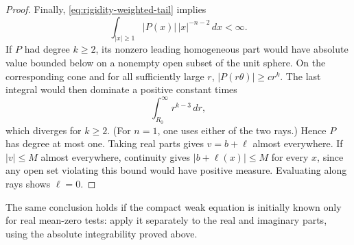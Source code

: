 \begin{proof}
Finally, \eqref{eq:rigidity-weighted-tail} implies
\[
 \int_{|x|\ge1}|P(x)|\,|x|^{-n-2}\,dx<\infty.
\]
If $P$ had degree $k\ge2$, its nonzero leading homogeneous part would
have absolute value bounded below on a nonempty open subset of the unit
sphere.  On the corresponding cone and for all sufficiently large $r$,
$|P(r\theta)|\ge c r^k$.  The last integral would then dominate a
positive constant times
\[
 \int_{R_0}^{\infty}r^{k-3}\,dr,
\]
which diverges for $k\ge2$.  (For $n=1$, one uses either of the two
rays.)  Hence $P$ has degree at most one.  Taking real parts gives
$v=b+\ell$ almost everywhere.
If $|v|\le M$ almost everywhere, continuity gives
$|b+\ell(x)|\le M$ for every $x$, since any open set violating this bound
would have positive measure.  Evaluating along rays shows $\ell=0$.
\end{proof}

The same conclusion holds if the compact weak equation is initially
known only for real mean-zero tests: apply it separately to the real and
imaginary parts, using the absolute integrability proved above.
